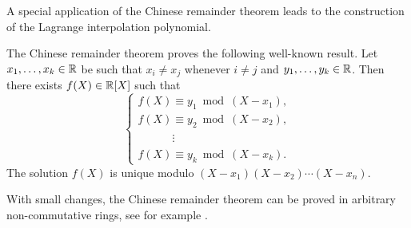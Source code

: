 A special application of the Chinese remainder theorem leads to the construction of the Lagrange 
interpolation polynomial.

\begin{bonus}
	The Chinese remainder theorem proves the following well-known result. 
	Let $x_1,\dots,x_k\in\mathbb{R}$ be such that $x_i\ne x_j$ whenever $i\ne j$ 
	and $y_1,\dots,y_k\in\mathbb{R}$. Then there exists $f(X)\in\mathbb{R}[X]$ such that
	\[
	\begin{cases}
		f(X)\equiv y_1\bmod (X-x_1),\\
		f(X)\equiv y_2\bmod (X-x_2),\\
		\phantom{f(X)}\vdots\\
		f(X)\equiv y_k\bmod (X-x_k).  	
	\end{cases}
 	\]
 	The solution $f(X)$ is unique modulo $(X-x_1)(X-x_2)\cdots (X-x_n)$. 
\end{bonus}



With small changes, the Chinese remainder theorem can be proved 
in arbitrary non-commutative rings, see for example 
\cite[Chapter III, Theorem 2.25]{MR600654}. 